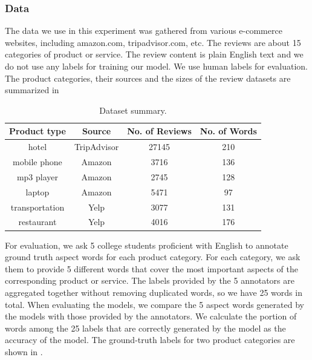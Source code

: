 \subsubsection{Data}

The data we use in this experiment was gathered from various e-commerce 
websites, including amazon.com, tripadvisor.com, etc. 
The reviews are about 15 categories of product or service. 
The review content is plain English text and we do not use any labels 
for training our model. We use human labels for evaluation. 
The product categories, their sources and the sizes of the review datasets
are summarized in 

\begin{table}[th]
\small
\centering
\caption{Dataset summary.} 
\label{table:dataset}
\begin{tabular}{|c|c|c|c|}
\hline
Product type & Source & No. of Reviews & No. of Words \\ \hline \hline
hotel        & TripAdvisor & 27145   & 210 \\\hline
mobile phone & Amazon & 3716    & 136 \\\hline
mp3 player   & Amazon & 2745    & 128 \\\hline
laptop       & Amazon & 5471    & 97  \\\hline
transportation & Yelp & 3077  & 131 \\\hline
restaurant   & Yelp & 4016    & 176 \\\hline
\end{tabular}
\end{table}


For evaluation, we ask 5 college students proficient with English 
to annotate ground truth
aspect words for each product category. For each category, 
we ask them to provide 5 different words that cover the most important 
aspects of the corresponding product or service. The labels provided by the
5 annotators are aggregated together without removing duplicated words, 
so we have 25 words in total. 
When evaluating the models, 
we compare the 5 aspect words generated by the models with those provided 
by the annotators. 
We calculate the portion of words among the 25 labels that 
are correctly generated by the model as the accuracy of the model.
The ground-truth labels for two product categories are shown 
in .


